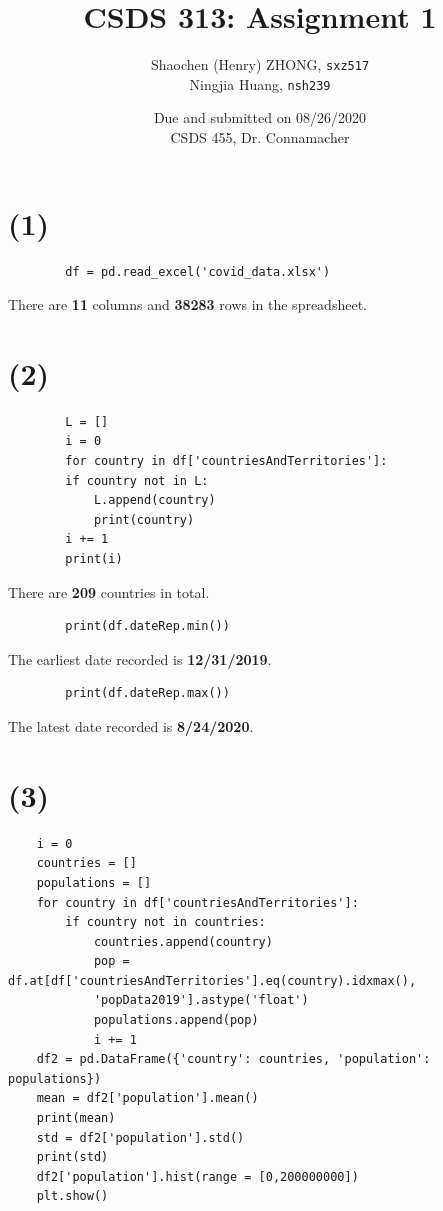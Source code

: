 \documentclass[12pt]{article}
\newcommand{\ilc}{\texttt}
\begin{document}
\title{\textbf{CSDS 313: Assignment 1}}

\author{Shaochen (Henry) ZHONG, \ilc{sxz517} \\Ningjia Huang, \ilc{nsh239}}
\date{Due and submitted on 08/26/2020 \\ CSDS 455, Dr. Connamacher}
\maketitle




    \section*{(1)}
    \begin{lstlisting}
        df = pd.read_excel('covid_data.xlsx')
    \end{lstlisting}

    There are \textbf{11} columns and \textbf{38283} rows in the spreadsheet.

    \section*{(2)}
    \begin{lstlisting}
        L = []
        i = 0
        for country in df['countriesAndTerritories']:
        if country not in L:
            L.append(country)
            print(country)
        i += 1
        print(i)
    \end{lstlisting}

   There are \textbf{209} countries in total.

    \begin{lstlisting}
        print(df.dateRep.min())
    \end{lstlisting}

    The earliest date recorded is \textbf{12/31/2019}.

    \begin{lstlisting}
        print(df.dateRep.max())
    \end{lstlisting}

    The latest date recorded is \textbf{8/24/2020}.

    \section*{(3)}
    \begin{lstlisting}
    i = 0
    countries = []
    populations = []
    for country in df['countriesAndTerritories']:
        if country not in countries:
            countries.append(country)
            pop = df.at[df['countriesAndTerritories'].eq(country).idxmax(),
            'popData2019'].astype('float')
            populations.append(pop)
            i += 1
    df2 = pd.DataFrame({'country': countries, 'population': populations})
    mean = df2['population'].mean()
    print(mean)
    std = df2['population'].std()
    print(std)
    df2['population'].hist(range = [0,200000000])
    plt.show()
    \end{lstlisting}
\end{document}
